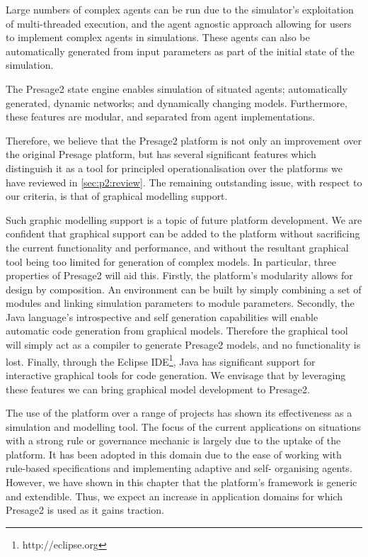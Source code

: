 Large numbers of complex agents can be run due to the simulator's exploitation
of multi-threaded execution, and the agent agnostic approach allowing for users
to implement complex agents in simulations. These agents can also be
automatically generated from input parameters as part of the initial state of
the simulation.

The Presage2 state engine enables simulation of situated agents;
automatically generated, dynamic networks; and dynamically changing models.
Furthermore, these features are modular, and separated from agent
implementations.

Therefore, we believe that the Presage2 platform is not only an improvement over
the original Presage platform, but has several significant features which
distinguish it as a tool for principled operationalisation over the platforms we
have reviewed in \autoref{sec:p2:review}. The remaining outstanding issue, with
respect to our criteria, is that of graphical modelling support.

Such graphic modelling support is a topic of future platform development. We are
confident that graphical support can be added to the platform without
sacrificing the current functionality and performance, and without the resultant
graphical tool being too limited for generation of complex models. In
particular, three properties of Presage2 will aid this. Firstly, the platform's
modularity allows for design by composition. An environment can be built by
simply combining a set of modules and linking simulation parameters to module
parameters. Secondly, the Java language's introspective and self generation
capabilities will enable automatic code generation from graphical models.
Therefore the graphical tool will simply act as a compiler to generate Presage2
models, and no functionality is lost. Finally, through the Eclipse IDE\footnote{
http://eclipse.org}, Java has significant support for interactive graphical
tools for code generation. We envisage that by leveraging these features we can
bring graphical model development to Presage2.

The use of the platform over a range of projects has shown its effectiveness
as a simulation and modelling tool. The focus of the current applications on
situations with a strong rule or governance mechanic is largely due to the
uptake of the platform. It has been adopted in this domain due to the ease of
working with rule-based specifications and implementing adaptive and self-
organising agents. However, we have shown in this chapter that the platform's
framework is generic and extendible. Thus, we expect an increase in application
domains for which Presage2 is used as it gains traction.



